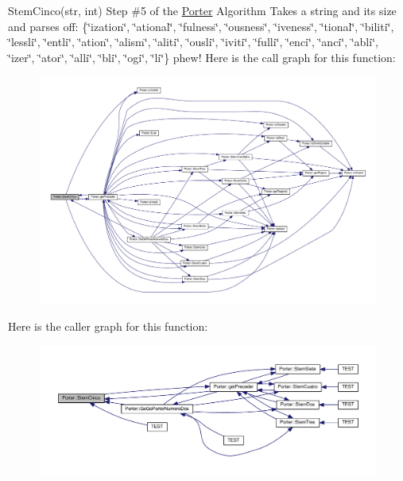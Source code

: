 Stem\+Cinco(str, int) Step \#5 of the \hyperlink{class_porter}{Porter} Algorithm Takes a string and its size and parses off\+: \{\char`\"{}ization\char`\"{}, \char`\"{}ational\char`\"{}, \char`\"{}fulness\char`\"{}, \char`\"{}ousness\char`\"{}, \char`\"{}iveness\char`\"{}, \char`\"{}tional\char`\"{}, \char`\"{}biliti\char`\"{}, \char`\"{}lessli\char`\"{}, \char`\"{}entli\char`\"{}, \char`\"{}ation\char`\"{}, \char`\"{}alism\char`\"{}, \char`\"{}aliti\char`\"{}, \char`\"{}ousli\char`\"{}, \char`\"{}iviti\char`\"{}, \char`\"{}fulli\char`\"{}, \char`\"{}enci\char`\"{}, \char`\"{}anci\char`\"{}, \char`\"{}abli\char`\"{}, \char`\"{}izer\char`\"{}, \char`\"{}ator\char`\"{}, \char`\"{}alli\char`\"{}, \char`\"{}bli\char`\"{}, \char`\"{}ogi\char`\"{}, \char`\"{}li\char`\"{}\} phew! Here is the call graph for this function\+:
\nopagebreak
\begin{figure}[H]
\begin{center}
\leavevmode
\includegraphics[width=350pt]{class_porter_a916f45b55a1bbdaff7ce1db3d9a42813_cgraph}
\end{center}
\end{figure}
Here is the caller graph for this function\+:
\nopagebreak
\begin{figure}[H]
\begin{center}
\leavevmode
\includegraphics[width=350pt]{class_porter_a916f45b55a1bbdaff7ce1db3d9a42813_icgraph}
\end{center}
\end{figure}
\mbox{\label{class_porter_aa1e1b416311f37b827bc093bb03ca500}} 
